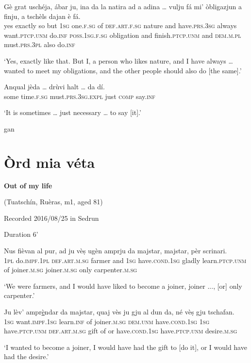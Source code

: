 \begin{linenumbers}
\gll Gè grat uschéja, ábar ju, ina da la natira ad a adina … vulju fá mi' òbligazjun a finju, a tschèls dajan è fá.   \\
yes exactly so but \textsc{1sg} one.\textsc{f.sg} of \textsc{def.art.f.sg} nature and have.\textsc{prs.3sg} always {} want.\textsc{ptcp.unm} do.\textsc{inf} \textsc{poss.1sg.f.sg} obligation and finish.\textsc{ptcp.unm} and \textsc{dem.m.pl} must.\textsc{prs.3pl} also do.\textsc{inf}\\
\end{linenumbers}
\medskip
\glt `Yes, exactly like that. But I, a person who likes nature, and I have always … wanted to meet my obligations, and the other people should also do [the same].'
\medskip

\begin{linenumbers}
\gll  Anqual jèda … drùvi halt … da dí.\\
some time.\textsc{f.sg} {} must.\textsc{prs.3sg.expl} just {} \textsc{comp} say.\textsc{inf}\\
\end{linenumbers}
\medskip
\glt `It is sometimes … just necessary … to say [it].'
\medskip

gan\section{Òrd mia véta}


\textbf{Out of my life}

\noindent
(Tuatschín, Ruèras, m1, aged 81)

\noindent
Recorded 2016/08/25 in Sedrun

Duration 6'
\bigskip


\begin{linenumbers}
\gll    Nus fièvan al pur, ad ju vèṣ ugèn amprju da majstar, majstar, pèr scrinari.\\
 \textsc{1pl} do.\textsc{impf.1pl} \textsc{def.art.m.sg} farmer and \textsc{1sg} have.\textsc{cond.1sg} gladly learn.\textsc{ptcp.unm} of joiner.\textsc{m.sg} joiner.\textsc{m.sg} only carpenter.\textsc{m.sg}\\
\end{linenumbers}
\medskip
\glt `We were farmers, and I would have liked to become a joiner, joiner ..., [or] only carpenter.'
\medskip

\begin{linenumbers}
\gll    Ju lèv’ ampr\underline{è}ndar da majstar, quaj vès ju gju al dun da, né vèṣ gju tschafan.\\
 \textsc{1sg} want.\textsc{impf.1sg} learn.\textsc{inf} of joiner.\textsc{m.sg} \textsc{dem.unm} have.\textsc{cond.1sg} \textsc{1sg} have.\textsc{ptcp.unm} \textsc{def.art.m.sg} gift of or have.\textsc{cond.1sg} have.\textsc{ptcp.unm} desire.\textsc{m.sg}\\
\end{linenumbers}
\medskip
\glt `I wanted to become a joiner, I would have had the gift to [do it], or I would have had the desire.'
\medskip

